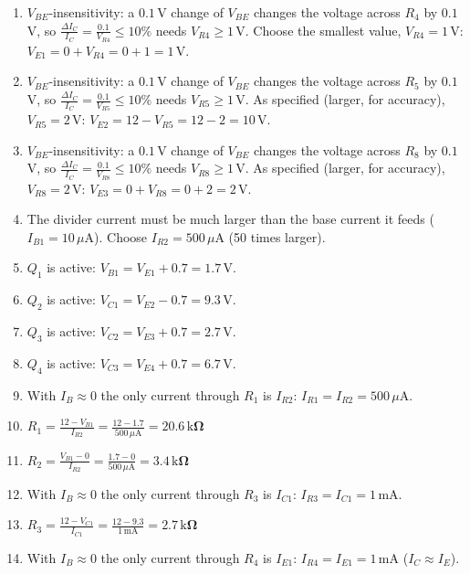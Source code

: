 \documentclass[11pt]{article}
\newcommand{\solstep}[2]{\par\medskip{\color{stepc}\textbf{Step #1 --- #2}}\par\nopagebreak}
\begin{document}
\solstep{2}{Design, node by node}\begin{enumerate}[leftmargin=*,itemsep=3pt]
\item $V_{BE}$-insensitivity: a $0.1$\,V change of $V_{BE}$ changes the voltage across $R_{4}$ by $0.1$\,V, so $\frac{\Delta I_C}{I_C} = \frac{0.1}{V_{R4}} \le 10\%$ needs $V_{R4} \ge 1$\,V. Choose the smallest value, $V_{R4} = 1$\,V: $V_{E1} = 0 + V_{R4} = 0 + 1 = 1\,\mathrm{V}$.
\item $V_{BE}$-insensitivity: a $0.1$\,V change of $V_{BE}$ changes the voltage across $R_{5}$ by $0.1$\,V, so $\frac{\Delta I_C}{I_C} = \frac{0.1}{V_{R5}} \le 10\%$ needs $V_{R5} \ge 1$\,V. As specified (larger, for accuracy), $V_{R5} = 2$\,V: $V_{E2} = 12 - V_{R5} = 12 - 2 = 10\,\mathrm{V}$.
\item $V_{BE}$-insensitivity: a $0.1$\,V change of $V_{BE}$ changes the voltage across $R_{8}$ by $0.1$\,V, so $\frac{\Delta I_C}{I_C} = \frac{0.1}{V_{R8}} \le 10\%$ needs $V_{R8} \ge 1$\,V. As specified (larger, for accuracy), $V_{R8} = 2$\,V: $V_{E3} = 0 + V_{R8} = 0 + 2 = 2\,\mathrm{V}$.
\item The divider current must be much larger than the base current it feeds ($I_{B1} = 10\,\mu \mathrm{A}$). Choose $I_{R2} = 500\,\mu \mathrm{A}$ (50 times larger).
\item $Q_{1}$ is active: $V_{B1} = V_{E1} + 0.7 = 1.7\,\mathrm{V}$.
\item $Q_{2}$ is active: $V_{C1} = V_{E2} - 0.7 = 9.3\,\mathrm{V}$.
\item $Q_{3}$ is active: $V_{C2} = V_{E3} + 0.7 = 2.7\,\mathrm{V}$.
\item $Q_{4}$ is active: $V_{C3} = V_{E4} + 0.7 = 6.7\,\mathrm{V}$.
\item With $I_B\approx0$ the only current through $R_{1}$ is $I_{R2}$: $I_{R1} = I_{R2} = 500\,\mu \mathrm{A}$.
\item $\displaystyle R_{1} = \frac{12 - V_{B1}}{I_{R2}} = \frac{12 - 1.7}{500\,\mu \mathrm{A}} = \mathbf{20.6\,\mathrm{k}\Omega}$
\item $\displaystyle R_{2} = \frac{V_{B1} - 0}{I_{R2}} = \frac{1.7 - 0}{500\,\mu \mathrm{A}} = \mathbf{3.4\,\mathrm{k}\Omega}$
\item With $I_B\approx0$ the only current through $R_{3}$ is $I_{C1}$: $I_{R3} = I_{C1} = 1\,\mathrm{m}\mathrm{A}$.
\item $\displaystyle R_{3} = \frac{12 - V_{C1}}{I_{C1}} = \frac{12 - 9.3}{1\,\mathrm{m}\mathrm{A}} = \mathbf{2.7\,\mathrm{k}\Omega}$
\item With $I_B\approx0$ the only current through $R_{4}$ is $I_{E1}$: $I_{R4} = I_{E1} = 1\,\mathrm{m}\mathrm{A}$ ($I_C\approx I_E$).

\end{enumerate}
\end{document}

